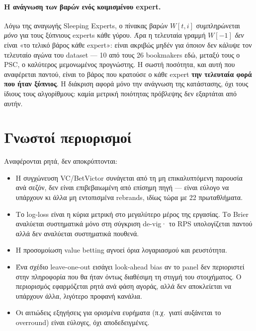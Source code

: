 \documentclass[11pt,a4paper]{article}
\renewcommand{\_}{\oldunderscore\allowbreak}
\begin{document}
\paragraph{Η ανάγνωση των βαρών ενός κοιμισμένου expert.} Λόγω της αναγωγής Sleeping Experts,
ο πίνακας βαρών $W[t,i]$ συμπληρώνεται \emph{μόνο} για τους ξύπνιους experts κάθε γύρου. Άρα
η τελευταία γραμμή $W[-1]$ \emph{δεν} είναι «το τελικό βάρος κάθε expert»: είναι ακριβώς
μηδέν για όποιον δεν κάλυψε τον τελευταίο αγώνα του dataset --- 10 από τους 26 bookmakers
εδώ, μεταξύ τους ο PSC, ο καλύτερος μεμονωμένος προγνώστης. Η σωστή ποσότητα, και αυτή που
αναφέρεται παντού, είναι το βάρος που κρατούσε ο κάθε expert \textbf{την τελευταία φορά που
ήταν ξύπνιος}. Η διάκριση αφορά μόνο την ανάγνωση της κατάστασης, όχι τους ίδιους τους
αλγορίθμους: καμία μετρική ποιότητας πρόβλεψης δεν εξαρτάται από αυτήν.

\section{Γνωστοί περιορισμοί}

Αναφέρονται ρητά, δεν αποκρύπτονται:

\begin{itemize}
  \item Η συγχώνευση VC/BetVictor συνάγεται από τη μη επικαλυπτόμενη παρουσία ανά σεζόν, δεν
        είναι επιβεβαιωμένη από επίσημη πηγή --- είναι εύλογο να υπάρχουν κι άλλα μη
        εντοπισμένα rebrands, ιδίως τώρα με 22 πρωταθλήματα.
  \item Το log-loss είναι η κύρια μετρική στο μεγαλύτερο μέρος της εργασίας. Το Brier
        αναλύεται συστηματικά μόνο στη σύγκριση de-vig· το RPS υπολογίζεται παντού αλλά δεν
        αναλύεται συστηματικά πουθενά.
  \item Η προσομοίωση value betting αγνοεί όρια λογαριασμού και ρευστότητα.
  \item Ένα σχέδιο leave-one-out εισάγει look-ahead bias αν το panel δεν περιοριστεί στην
        πληροφορία που θα ήταν όντως διαθέσιμη τη στιγμή του στοιχήματος. Ο περιορισμός
        εφαρμόζεται ρητά ανά φάση αγοράς, αλλά δεν αποκλείεται να υπάρχουν άλλα, λιγότερο
        προφανή κανάλια.
  \item Οι αιτιώδεις εξηγήσεις για ορισμένα ευρήματα (π.χ.\ γιατί αυξάνεται το overround)
        είναι εύλογες, όχι αποδεδειγμένες.
\end{itemize}
\end{document}

